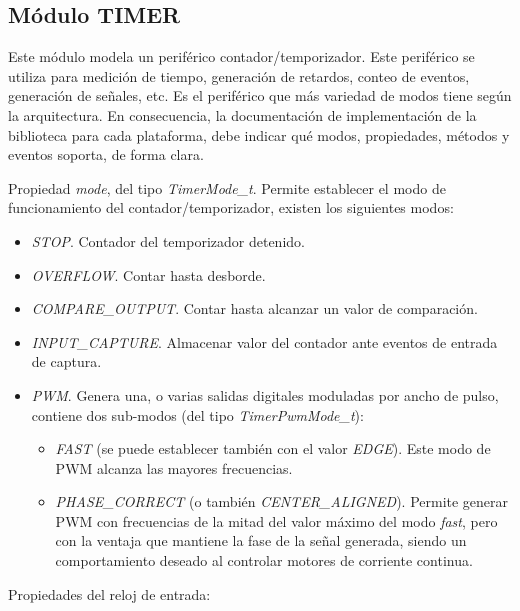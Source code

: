 \subsection{Módulo TIMER}

Este módulo modela un periférico contador/temporizador. Este periférico se utiliza para medición de tiempo, generación de retardos, conteo de eventos, generación de señales, etc. Es el periférico que más variedad de modos tiene según la arquitectura. En consecuencia, la documentación de implementación de la biblioteca para cada plataforma, debe indicar qué modos, propiedades, métodos y eventos soporta, de forma clara.


Propiedad \emph{mode}, del tipo \emph{TimerMode\_t}. Permite establecer el modo de funcionamiento del contador/temporizador, existen los siguientes modos:

\begin{itemize}
\item
\emph{STOP}. Contador del temporizador detenido.
\item
\emph{OVERFLOW}. Contar hasta desborde.
\item
\emph{COMPARE\_OUTPUT}. Contar hasta alcanzar un valor de comparación.
\item
\emph{INPUT\_CAPTURE}. Almacenar valor del contador ante eventos de entrada de captura.
\item
\emph{PWM}. Genera una, o varias salidas digitales moduladas por ancho de pulso, contiene dos sub-modos (del tipo \emph{TimerPwmMode\_t}):
\begin{itemize}
\item
\emph{FAST} (se puede establecer también con el valor \emph{EDGE}). Este modo de PWM alcanza las mayores frecuencias.
\item
\emph{PHASE\_CORRECT} (o también \emph{CENTER\_ALIGNED}). Permite generar PWM con frecuencias de la mitad del valor máximo del modo \emph{fast}, pero con la ventaja que  mantiene la fase de la señal generada, siendo un comportamiento deseado al controlar motores de corriente continua.
\end{itemize}
\end{itemize}

Propiedades del reloj de entrada:

